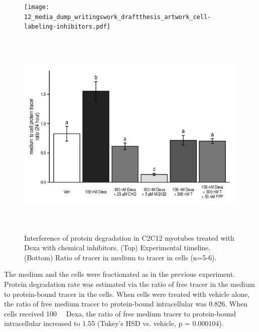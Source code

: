 \documentclass[12pt,english]{report}\usepackage[]{graphicx}\usepackage[]{color}
\newenvironment{knitrout}{}{} %
\begin{document}
\begin{figure}
\begin{minipage}[t][1.8in]{6in}%
\texttt{[image: 12\_media\_dump\_writingswork\_draftthesis\_artwork\_cell-labeling-inhibitors.pdf]}%
\end{minipage}

\begin{minipage}[t][4.5in][c]{6in}%
\begin{knitrout}
\color{fgcolor}
\includegraphics[width=6in,height=4in]{figure/inhibitors-1} 

\end{knitrout}
%
\end{minipage} 

\protect\caption[Interference of protein degradation in C2C12 myotubes treated with
Dexa with chemical inhibitors.]{Interference of protein degradation in C2C12 myotubes treated with
Dexa with chemical inhibitors. (Top) Experimental timeline. (Bottom)
Ratio of tracer in medium to tracer in cells (n=5-6).\label{fig:protein-degradation-cells-inhibitors}}
\end{figure}


The medium and the cells were fractionated as in the previous experiment.
Protein degradation rate was estimated via the ratio of free tracer
in the medium to protein-bound tracer in the cells. When cells were
treated with vehicle alone, the ratio of free medium tracer to protein-bound
intracellular was 0.826.
When cells received \SI{100}{\nano\molar} Dexa, the ratio of free
medium tracer to protein-bound intracellular increased to 1.55
(Tukey's HSD vs. vehicle, p = 0.000104).
\end{document}

